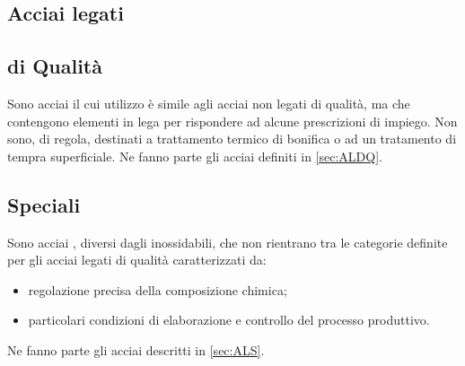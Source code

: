 \subsection{Acciai legati}
\begin{multicols}{2}[]
\subsection{di Qualità}
Sono acciai il cui utilizzo è simile agli acciai non legati di qualità, ma che contengono elementi in lega per rispondere ad alcune prescrizioni di impiego.
Non sono, di regola, destinati a trattamento termico di bonifica o ad un tratamento di tempra superficiale.
Ne fanno parte gli acciai definiti in \ref{sec:ALDQ}.
\columnbreak
\subsection{Speciali}
Sono acciai , diversi dagli inossidabili, che non rientrano tra le categorie definite per gli acciai legati di qualità caratterizzati da:
\begin{itemize}
\item regolazione precisa della composizione chimica;
\item particolari condizioni di elaborazione e controllo del processo produttivo.
\end{itemize}
Ne fanno parte gli acciai descritti in \ref{sec:ALS}.
\end{multicols}